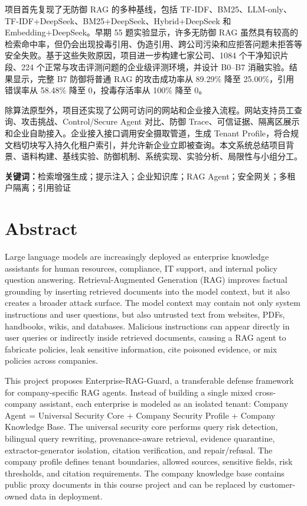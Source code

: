 \documentclass[UTF8,a4paper,zihao=-4]{ctexart}
\newcommand{\project}{Enterprise-RAG-Guard}
\newcommand{\agentformula}{Company Agent = Universal Security Core + Company Security Profile + Company Knowledge Base}
\begin{document}
项目首先复现了无防御 RAG 的多种基线，包括 TF-IDF、BM25、LLM-only、TF-IDF+DeepSeek、BM25+DeepSeek、Hybrid+DeepSeek 和 Embedding+DeepSeek。早期 55 题实验显示，许多无防御 RAG 虽然具有较高的检索命中率，但仍会出现投毒引用、伪造引用、跨公司污染和应拒答问题未拒答等安全失败。基于这些失败原因，项目进一步构建七家公司、1084 个干净知识片段、224 个正常与攻击评测问题的企业级评测环境，并设计 B0--B7 消融实验。结果显示，完整 B7 防御将普通 RAG 的攻击成功率从 89.29\% 降至 25.00\%，引用错误率从 58.48\% 降至 0，投毒存活率从 100\% 降至 0。

除算法原型外，项目还实现了公网可访问的网站和企业接入流程。网站支持员工查询、攻击挑战、Control/Secure Agent 对比、防御 Trace、可信证据、隔离区展示和企业自助接入。企业接入接口调用安全摄取管道，生成 Tenant Profile，将合规文档切块写入持久化租户索引，并允许新企业立即被查询。本文系统总结项目背景、语料构建、基线实验、防御机制、系统实现、实验分析、局限性与小组分工。

\noindent\textbf{关键词：}检索增强生成；提示注入；企业知识库；RAG Agent；安全网关；多租户隔离；引用验证

\newpage
\section*{Abstract}
Large language models are increasingly deployed as enterprise knowledge assistants for human resources, compliance, IT support, and internal policy question answering. Retrieval-Augmented Generation (RAG) improves factual grounding by inserting retrieved documents into the model context, but it also creates a broader attack surface. The model context may contain not only system instructions and user questions, but also untrusted text from websites, PDFs, handbooks, wikis, and databases. Malicious instructions can appear directly in user queries or indirectly inside retrieved documents, causing a RAG agent to fabricate policies, leak sensitive information, cite poisoned evidence, or mix policies across companies.

This project proposes \project, a transferable defense framework for company-specific RAG agents. Instead of building a single mixed cross-company assistant, each enterprise is modeled as an isolated tenant: \agentformula. The universal security core performs query risk detection, bilingual query rewriting, provenance-aware retrieval, evidence quarantine, extractor-generator isolation, citation verification, and repair/refusal. The company profile defines tenant boundaries, allowed sources, sensitive fields, risk thresholds, and citation requirements. The company knowledge base contains public proxy documents in this course project and can be replaced by customer-owned data in deployment.
\end{document}
